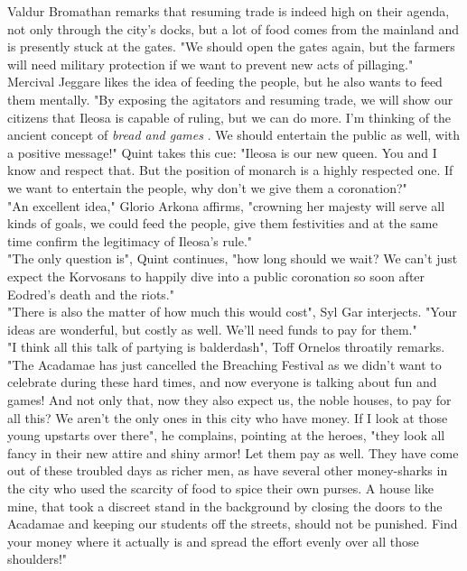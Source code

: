 Valdur Bromathan remarks that resuming trade is indeed high on their agenda, not only through the city's docks, but a lot of food comes from the mainland and is presently stuck at the gates. "We should open the gates again, but the farmers will need military protection if we want to prevent new acts of pillaging."\\

Mercival Jeggare likes the idea of feeding the people, but he also wants to feed them mentally. "By exposing the agitators and resuming trade, we will show our citizens that Ileosa is capable of ruling, but we can do more. I'm thinking of the ancient concept of {\itshape bread and games} . We should entertain the public as well, with a positive message!" Quint takes this cue: "Ileosa is our new queen. You and I know and respect that. But the position of monarch is a highly respected one. If we want to entertain the people, why don't we give them a coronation?"\\

"An excellent idea," Glorio Arkona affirms, "crowning her majesty will serve all kinds of goals, we could feed the people, give them festivities and at the same time confirm the legitimacy of Ileosa's rule."\\

"The only question is", Quint continues, "how long should we wait? We can't just expect the Korvosans to happily dive into a public coronation so soon after Eodred's death and the riots."\\

"There is also the matter of how much this would cost", Syl Gar interjects. "Your ideas are wonderful, but costly as well. We'll need funds to pay for them."\\

"I think all this talk of partying is balderdash", Toff Ornelos throatily remarks. "The Acadamae has just cancelled the Breaching Festival as we didn't want to celebrate during these hard times, and now everyone is talking about fun and games! And not only that, now they also expect us, the noble houses, to pay for all this? We aren't the only ones in this city who have money. If I look at those young upstarts over there", he complains, pointing at the heroes, "they look all fancy in their new attire and shiny armor! Let them pay as well. They have come out of these troubled days as richer men, as have several other money-sharks in the city who used the scarcity of food to spice their own purses. A house like mine, that took a discreet stand in the background by closing the doors to the Acadamae and keeping our students off the streets, should not be punished. Find your money where it actually is and spread the effort evenly over all those shoulders!"\\

